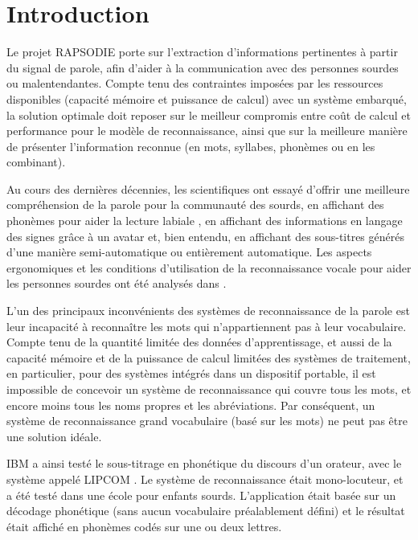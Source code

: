 \documentclass[10pt,a4paper,twoside]{article}
\begin{document}



\section{Introduction}

Le projet RAPSODIE porte sur l'extraction d'informations pertinentes à partir du signal de parole, afin d'aider à la communication avec des personnes sourdes ou malentendantes. Compte tenu des contraintes imposées par les ressources disponibles (capacité mémoire et puissance de calcul) avec un système embarqué, la solution optimale doit reposer sur le meilleur compromis entre coût de calcul et performance pour le modèle de reconnaissance, ainsi que sur la meilleure manière de présenter l'information reconnue (en mots, syllabes, phonèmes ou en les combinant).

Au cours des dernières décennies, les scientifiques ont essayé d'offrir une meilleure compréhension de la parole pour la communauté des sourds, en affichant des phonèmes pour aider la lecture labiale \cite{Sokol1996}, en affichant des informations en langage des signes grâce à un avatar \cite{Cox2002} et, bien entendu, en affichant des sous-titres générés d'une manière semi-automatique ou entièrement automatique. Les aspects ergonomiques et les conditions d'utilisation de la reconnaissance vocale pour aider les personnes sourdes ont été analysés dans \cite{Woodcock1997}.

L'un des principaux inconvénients des systèmes de reconnaissance de la parole est leur incapacité à reconnaître les mots qui n'appartiennent pas à leur vocabulaire. Compte tenu de la quantité limitée des données d'apprentissage, et aussi de la capacité mémoire et de la puissance de calcul limitées des systèmes de traitement, en particulier, pour des systèmes intégrés dans un dispositif portable, il est impossible de concevoir un système de reconnaissance qui couvre tous les mots, et encore moins tous les noms propres et les abréviations. Par conséquent, un système de reconnaissance grand vocabulaire (basé sur les mots) ne peut pas être une solution idéale.

IBM a ainsi testé le sous-titrage en phonétique du discours d'un orateur, avec le système appelé LIPCOM \cite{Coursant1999}. Le système de reconnaissance était mono-locuteur, et a été testé dans une école pour enfants sourds. L'application était basée sur un décodage phonétique (sans aucun vocabulaire préalablement défini) et le résultat était affiché en phonèmes codés sur une ou deux lettres. 
\end{document}
